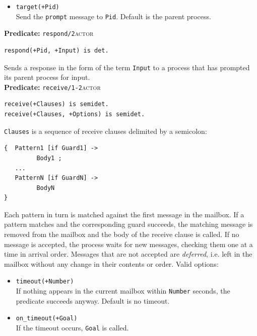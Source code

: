 \begin{itemize}
\item
  \texttt{target(+Pid)}\\
  Send the \texttt{prompt} message to \texttt{Pid}. Default is the parent
  process.
\end{itemize}

\noindent \textbf{Predicate:} \texttt{respond/2}\hfill\textsc{actor}

\begin{verbatim}
respond(+Pid, +Input) is det.
\end{verbatim}

\noindent Sends a response in the form of the term \texttt{Input} to a process
that has prompted its parent process for input.\\

\noindent \textbf{Predicate:} \texttt{receive/1-2}\hfill\textsc{actor}

\begin{verbatim}
receive(+Clauses) is semidet.
receive(+Clauses, +Options) is semidet.
\end{verbatim}

\noindent \texttt{Clauses} is a sequence of receive clauses delimited by a
semicolon:

\begin{verbatim}
{  Pattern1 [if Guard1] ->
         Body1 ;
   ...
   PatternN [if GuardN] ->
         BodyN
}
\end{verbatim}

\noindent Each pattern in turn is matched against the first message in the
mailbox. If a pattern matches and the corresponding guard succeeds, the
matching message is removed from the mailbox and the body of the receive clause
is called. If no message is accepted, the process waits for new messages,
checking them one at a time in arrival order. Messages that are not accepted
are \textit{deferred}, i.e. left in the mailbox without any change in their
contents or order. Valid options:

\begin{itemize}
\item
  \texttt{timeout(+Number)}\\
  If nothing appears in the current mailbox within \texttt{Number} seconds,
  the predicate succeeds anyway. Default is no timeout.
\item
  \texttt{on\_timeout(+Goal)}\\
  If the timeout occurs, \texttt{Goal} is called.
\end{itemize}

